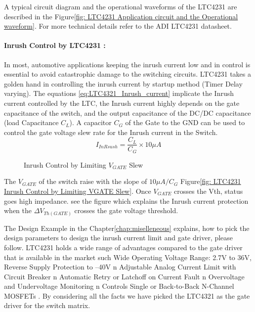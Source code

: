 A typical circuit diagram and the operational waveforms of the LTC4231 are described in the Figure\ref{fig: LTC4231 Application circuit and the Operational waveform}. 
For more technical details refer to the ADI LTC4231 datasheet\cite{LTC4231_User_Datasheet}.

\paragraph{Inrush Control by LTC4231 :}
In most, automotive applications keeping the inrush current low and in control is essential to avoid catastrophic damage to the switching circuits. LTC4231 takes a golden hand in controlling the inrush current by startup method (Timer Delay varying). The equations \ref{eq:LTC4321_Inrush_current} implicate the Inrush current controlled by the LTC, the Inrush current highly depends on the gate capacitance of the switch, and the output capacitance of the DC/DC capacitance (load Capacitance $C_L$). A capacitor $C_G$ of the Gate to the GND can be used to control the gate voltage slew rate for the Inrush current in the Switch.
\begin{equation}\label{eq:LTC4321_Inrush_current}
    I_{InRsush} = \frac{C_{L}}{C_{G}} \times 10\mu A
\end{equation}
\begin{figure}[h]
	\centering
    \caption{Inrush Control by Limiting $V_{GATE}$ Slew}
    \label{fig: LTC4231 Inrush Control by Limiting VGATE Slew }
\end{figure}
The $V_{GATE}$ of the switch raise with the slope of $10\mu A/C_G$ Figure\ref{fig: LTC4231 Inrush Control by Limiting VGATE Slew}.
Once $V_{GATE}$ crosses the Vth, status goes high impedance. see the figure\cite{fig: LTC4231 Inrush Control by Limiting VGATE Slew} which explains the Inrush current protection when the $\Delta V_{Th(GATE)}$ crosses the gate voltage threshold.

The Design Example in the Chapter\ref{chap:miselleneous} explains, how to pick the design parameters to design the inrush current limit and gate driver, please follow. LTC4231 holds a wide range of advantages compared to the gate driver that is available in the market such Wide Operating Voltage Range: 2.7V to 36V, Reverse Supply Protection to –40V n Adjustable Analog Current Limit with Circuit Breaker n Automatic Retry or Latchoff on Current Fault n Overvoltage and Undervoltage Monitoring n Controls Single or Back-to-Back N-Channel MOSFETs \cite{LTC4231_User_Datasheet}. By considering all the facts we have picked the LTC4321 as the gate driver for the switch matrix.